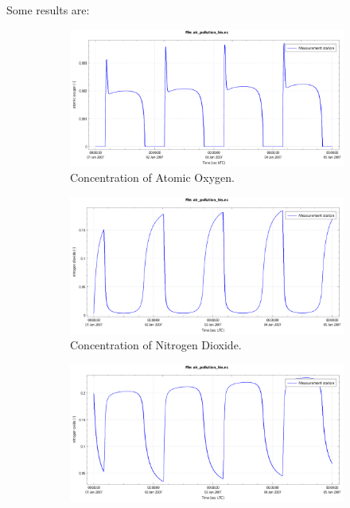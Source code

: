 \documentclass[biblatex]{mooiman_memo}
\begin{document}
Some results are:
\begin{figure}[H]
    \begin{subfigure}{0.5\textwidth}
        \includegraphics[width=\textwidth]{figures/atomic_oxygon_dt0d5.pdf}
        \caption{Concentration of Atomic Oxygen.}
    \end{subfigure}
    \begin{subfigure}{0.5\textwidth}
        \includegraphics[width=\textwidth]{figures/nitrogen_dioxide_dt0d5.pdf}
        \caption{Concentration of Nitrogen Dioxide.}
    \end{subfigure}
    \begin{subfigure}{0.5\textwidth}
        \includegraphics[width=\textwidth]{figures/nitrogen_oxide_dt0d5.pdf}

\end{subfigure}
\end{figure}
\end{document}

